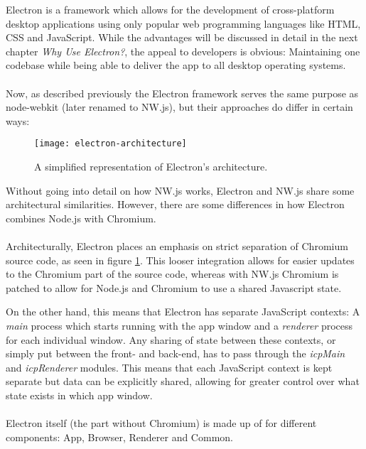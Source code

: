 Electron is a framework which allows for the development of cross-platform desktop applications using only popular 
web programming languages like HTML, CSS and JavaScript. 
While the advantages will be discussed in detail in the next chapter \emph{Why Use Electron?}, the appeal to developers
is obvious: Maintaining one codebase while being able to deliver the app to all desktop operating systems.\paragraph{}
Now, as described previously the Electron framework serves the same purpose as node-webkit (later renamed to NW.js), but
their approaches do differ in certain ways: \parencite{jensen2017}\par
\begin{figure}[ht]
    \texttt{[image: electron-architecture]}
    \caption{A simplified representation of Electron's architecture. \parencite{jensen2017}}
    \label{fig:el-architecture}
\end{figure}
Without going into detail on how NW.js works, Electron and NW.js share some architectural similarities.
However, there are some differences in how Electron combines Node.js with Chromium.\paragraph{}
Architecturally, Electron places an emphasis on strict separation of Chromium source code, 
as seen in figure \ref{fig:el-architecture}.
This looser integration allows for easier updates to the Chromium part of the source code, whereas with NW.js Chromium
is patched to allow for Node.js and Chromium to use a shared Javascript state. \parencite{jensen2017}\par
On the other hand, this means that Electron has separate JavaScript contexts: A \emph{main} process which starts running
with the app window and a \emph{renderer} process for each individual window.
Any sharing of state between these contexts, or simply put between the front- and back-end, has to pass through the
\emph{icpMain} and \emph{icpRenderer} modules.
This means that each JavaScript context is kept separate but data can be explicitly shared, allowing for greater control
over what state exists in which app window. \parencite{jensen2017}\paragraph{}
Electron itself (the part without Chromium) is made up of for different components: App, Browser, Renderer and Common.
